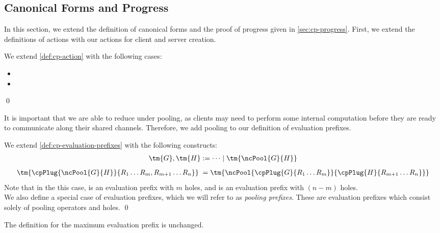 \documentclass[UKenglish]{llncs}
\begin{document}
\subsection{Canonical Forms and Progress}
In this section, we extend the definition of canonical forms and the proof of
progress given in \cref{sec:cp-progress}.
First, we extend the definitions of actions with our actions for client and
server creation.
\begin{definition}[Action]\label{def:nc-action}
  We extend \cref{def:cp-action} with the following cases:
  \begin{itemize}[noitemsep,topsep=0pt,parsep=0pt,partopsep=0pt]
  \item {}
  \item {}
  \end{itemize}    
  \qed
\end{definition}
It is important that we are able to reduce under pooling, as clients may need to
perform some internal computation before they are ready to communicate along
their shared channels.
Therefore, we add pooling to our definition of evaluation prefixes.
\begin{definition}\label{def:nc-evaluation-prefixes}
  We extend \cref{def:cp-evaluation-prefixes} with the following constructs:
  \begin{align*}
    \tm{G}, \tm{H} := \dots \mid \tm{\ncPool{G}{H}}
  \end{align*}
  \begin{align*}
    \tm{\cpPlug{\ncPool{G}{H}}{R_1 \dots R_m, R_{m+1} \dots R_{n}}} \; =
    \tm{\ncPool{\cpPlug{G}{R_1 \dots R_m}}{\cpPlug{H}{R_{m+1} \dots R_n}}}
  \end{align*}
  Note that in the this case,  is an evaluation prefix with $m$ holes,
  and  is an evaluation prefix with $(n-m)$ holes.
  \\
  We also define a special case of evaluation prefixes, which we will refer to
  as \emph{pooling prefixes}. These are evaluation prefixes which consist solely
  of pooling operators and holes. 
  \qed
\end{definition}
The definition for the maximum evaluation prefix is unchanged.
\end{document}

